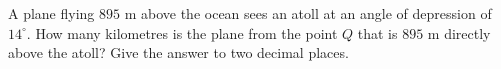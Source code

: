 A plane flying $895$ m above the ocean sees an atoll at an angle of depression of $14^\circ$. How many kilometres is the plane from the point $Q$ that is $895$ m directly above the atoll? Give the answer to two decimal places.
